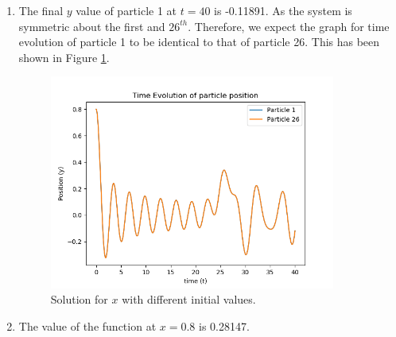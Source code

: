 \documentclass[11 pt]{article}
\begin{document}
\begin{enumerate}
\item The final $y$ value of particle 1 at $t=40$ is -0.11891. As the system is symmetric about the first and $26^{th}$. Therefore, we expect the graph for time evolution of particle 1 to be identical to that of particle 26. This has been shown in Figure \ref{fig2}.
\begin{figure}[!h]
\center\includegraphics[width=3.7in]{"../figures/Q8_p1_26_y_vs_t.png"}
\caption{Solution for $x$ with different initial values.}
\label{fig2}
\end{figure}

\item The value of the function at $x = 0.8$ is 0.28147.
\end{enumerate}
\end{document}
